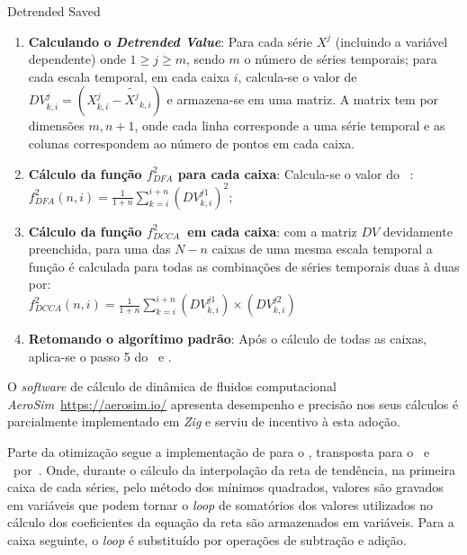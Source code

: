 \begin{algorithm} \caption{Detrended Saved} \label{alg:det_reused}
  \begin{enumerate}[label=4.\alph*]
      \item \textbf{Calculando o \emph{Detrended Value}}: Para cada série $X^{j}$ (incluindo a variável dependente) onde  $1 \ge j \ge m$, sendo $m$ o número de séries temporais; para cada escala temporal, em cada caixa $i$, calcula-se o valor de $DV^{j}_{k,i} = (X^{j}_{k,i}-\widetilde{X^{j}}_{k, i})$ e armazena-se em uma matriz. A matrix tem por dimensões $m, n+1$, onde cada linha corresponde a uma série temporal e as colunas correspondem ao número de pontos em cada caixa.
      \item \textbf{Cálculo da função $f_{DFA}^{2}$ para cada caixa}: Calcula-se o valor do \dfa~:\\[10pt]
          $f_{DFA}^{2}(n, i) = \frac{1}{1+n} \sum_{k=i}^{i + n}(DV^{j1}_{k,i})^{2}$;
      \item \textbf{Cálculo da função $f_{DCCA}^{2}$~em cada caixa}: com a matriz $DV$ devidamente preenchida, para uma das $N - n$ caixas de uma mesma escala temporal a função é calculada para todas as combinações de séries temporais duas à duas por:\\[10pt]
          $f_{DCCA}^{2}(n, i) = \frac{1}{1+n} \sum_{k=i}^{i + n}(DV^{j1}_{k,i}) \times (DV^{j2}_{k,i})$
      \item \textbf{Retomando o algorítimo padrão}: Após o cálculo de todas as caixas, aplica-se o passo 5 do \dfa~e \dcca. 
  \end{enumerate}
  \end{algorithm}

O \emph{software} de cálculo de dinâmica de fluidos computacional \emph{AeroSim}~\url{https://aerosim.io/} apresenta desempenho e precisão nos seus cálculos \cite{romanusViableFrameworkWind2023, lugariniLargeEddySimulations2024} é parcialmente implementado em \emph{Zig} e serviu de incentivo à esta adoção.

Parte da otimização segue a implementação de  para o \dfa, transposta para o \dcca~e \pdcca~por~. Onde, durante o cálculo da interpolação da reta de tendência, na primeira caixa de cada séries, pelo método dos mínimos quadrados, valores são gravados em variáveis que podem tornar o \emph{loop} de somatórios dos valores utilizados no cálculo dos coeficientes da equação da reta são armazenados em variáveis. Para a caixa seguinte, o \emph{loop} é substituído por operações de subtração e adição.



